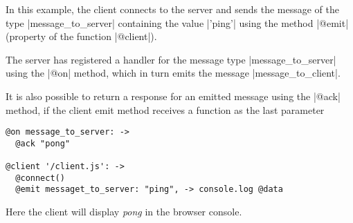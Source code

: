 In this example, the client connects to the server and sends the message of the
type |message_to_server| containing the value |'ping'| using the method |@emit|
(property of the function |@client|).

The server has registered a handler for the message type |message_to_server|
using the |@on| method, which in turn emits the message |message_to_client|.

It is also possible to return a response for an emitted message using the |@ack|
method, if the client emit method receives a function as the last parameter

\begin{verbatim}
@on message_to_server: ->
  @ack "pong"

@client '/client.js': ->
  @connect()
  @emit messaget_to_server: "ping", -> console.log @data
\end{verbatim}

Here the client will display \emph{pong} in the browser console.
